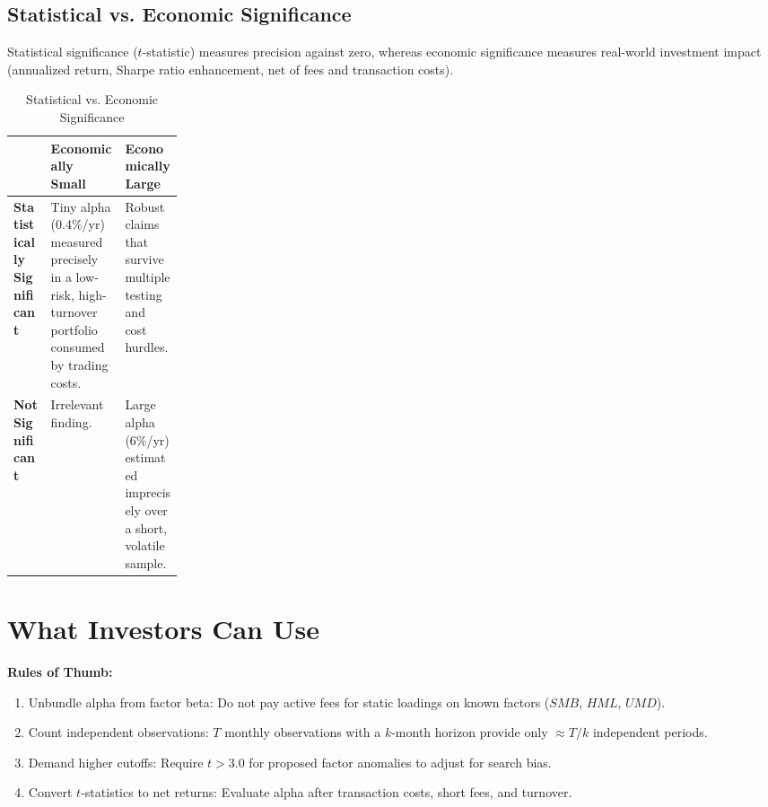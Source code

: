 \subsection{Statistical vs. Economic Significance}
\label{sec:03-economic}
Statistical significance ($t$-statistic) measures precision against zero, whereas economic significance measures real-world investment impact (annualized return, Sharpe ratio enhancement, net of fees and transaction costs).

\begin{table}[htbp]
\centering
\small
\caption{Statistical vs. Economic Significance}
\label{tab:03-stat-econ}
\begin{tabularx}{0.9\linewidth}{@{}>{\raggedright\arraybackslash}p{0.22\linewidth}>{\raggedright\arraybackslash}X>{\raggedright\arraybackslash}X@{}}
\toprule
 & Economically Small & Economically Large \\
\midrule
\textbf{Statistically Significant} & Tiny alpha (0.4\%/yr) measured precisely in a low-risk, high-turnover portfolio consumed by trading costs. & Robust claims that survive multiple testing and cost hurdles. \\
\textbf{Not Significant} & Irrelevant finding. & Large alpha (6\%/yr) estimated imprecisely over a short, volatile sample. \\
\bottomrule
\end{tabularx}
\end{table}

\section{What Investors Can Use}
\label{sec:03-investors}

\textbf{Rules of Thumb:}
\begin{enumerate}
  \item Unbundle alpha from factor beta: Do not pay active fees for static loadings on known factors ($SMB$, $HML$, $UMD$).
  \item Count independent observations: $T$ monthly observations with a $k$-month horizon provide only $\approx T/k$ independent periods.
  \item Demand higher cutoffs: Require $t > 3.0$ for proposed factor anomalies to adjust for search bias.
  \item Convert $t$-statistics to net returns: Evaluate alpha after transaction costs, short fees, and turnover.
\end{enumerate}

